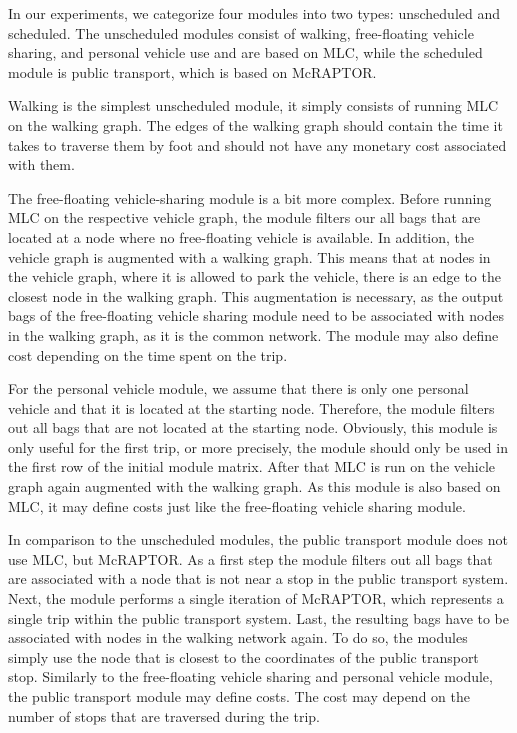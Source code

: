 In our experiments, we categorize four modules into two types: unscheduled and scheduled. 
The unscheduled modules consist of walking, free-floating vehicle sharing, and personal vehicle use and are based on MLC, while the scheduled module is public transport, which is based on McRAPTOR.

Walking is the simplest unscheduled module, it simply consists of running MLC on the walking graph.
The edges of the walking graph should contain the time it takes to traverse them by foot and should not have any monetary cost associated with them.

The free-floating vehicle-sharing module is a bit more complex.
Before running MLC on the respective vehicle graph, the module filters our all bags that are located at a node where no free-floating vehicle is available.
In addition, the vehicle graph is augmented with a walking graph. 
This means that at nodes in the vehicle graph, where it is allowed to park the vehicle, there is an edge to the closest node in the walking graph.
This augmentation is necessary, as the output bags of the free-floating vehicle sharing module need to be associated with nodes in the walking graph, as it is the common network.
The module may also define cost depending on the time spent on the trip.

For the personal vehicle module, we assume that there is only one personal vehicle and that it is located at the starting node.
Therefore, the module filters out all bags that are not located at the starting node.
Obviously, this module is only useful for the first trip, or more precisely, the module should only be used in the first row of the initial module matrix.
After that MLC is run on the vehicle graph again augmented with the walking graph.
As this module is also based on MLC, it may define costs just like the free-floating vehicle sharing module.

In comparison to the unscheduled modules, the public transport module does not use MLC, but McRAPTOR.
As a first step the module filters out all bags that are associated with a node that is not near a stop in the public transport system.
Next, the module performs a single iteration of McRAPTOR, which represents a single trip within the public transport system.
Last, the resulting bags have to be associated with nodes in the walking network again.
To do so, the modules simply use the node that is closest to the coordinates of the public transport stop.
Similarly to the free-floating vehicle sharing and personal vehicle module, the public transport module may define costs.
The cost may depend on the number of stops that are traversed during the trip.

